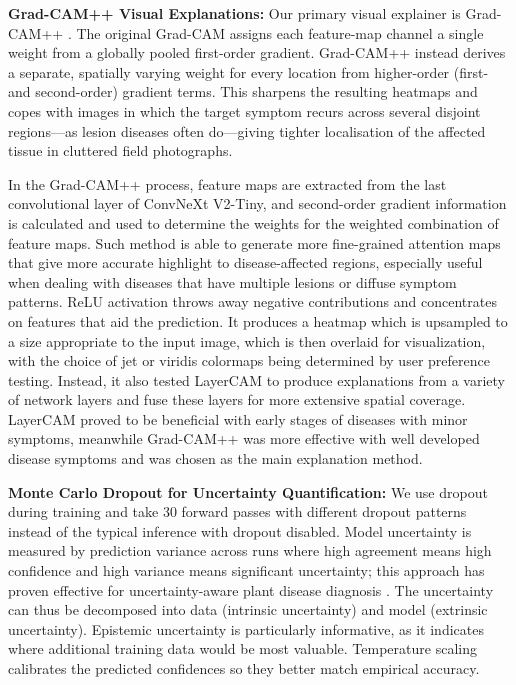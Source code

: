 \documentclass[pdflatex,sn-mathphys-num]{sn-jnl}%
\begin{document}
\textbf{Grad-CAM++ Visual Explanations:} Our primary visual explainer is Grad-CAM++ \cite{chattopadhay2018grad}. The original Grad-CAM assigns each feature-map channel a single weight from a globally pooled first-order gradient. Grad-CAM++ instead derives a separate, spatially varying weight for every location from higher-order (first- and second-order) gradient terms. This sharpens the resulting heatmaps and copes with images in which the target symptom recurs across several disjoint regions---as lesion diseases often do---giving tighter localisation of the affected tissue in cluttered field photographs.

In the Grad-CAM++ process, feature maps are extracted from the last convolutional layer of ConvNeXt V2-Tiny, and second-order gradient information is calculated and used to determine the weights for the weighted combination of feature maps. Such method is able to generate more fine-grained attention maps that give more accurate highlight to disease-affected regions, especially useful when dealing with diseases that have multiple lesions or diffuse symptom patterns. ReLU activation throws away negative contributions and concentrates on features that aid the prediction. It produces a heatmap which is upsampled to a size appropriate to the input image, which is then overlaid for visualization, with the choice of jet or viridis colormaps being determined by user preference testing. Instead, it also tested LayerCAM \cite{jiang2021layercam} to produce explanations from a variety of network layers and fuse these layers for more extensive spatial coverage. LayerCAM proved to be beneficial with early stages of diseases with minor symptoms, meanwhile Grad-CAM++ was more effective with well developed disease symptoms and was chosen as the main explanation method.

\textbf{Monte Carlo Dropout for Uncertainty Quantification:} We use dropout during training and take 30 forward passes with different dropout patterns instead of the typical inference with dropout disabled. Model uncertainty is measured by prediction variance across runs where high agreement means high confidence and high variance means significant uncertainty; this approach has proven effective for uncertainty-aware plant disease diagnosis \cite{pugazhendi2026sugarcanemcdropout}. The uncertainty can thus be decomposed into data (intrinsic uncertainty) and model (extrinsic uncertainty). Epistemic uncertainty is particularly informative, as it indicates where additional training data would be most valuable. Temperature scaling \cite{guo2017calibration} calibrates the predicted confidences so they better match empirical accuracy.
\end{document}
